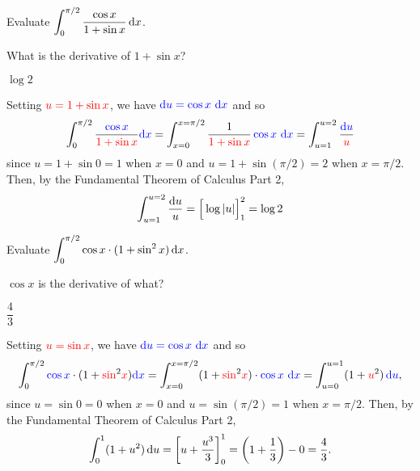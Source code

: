 \begin{question}[2012A]
Evaluate $\displaystyle \int_{0}^{\pi/2} \frac{\cos x} {1+\sin x}\,\mathrm{d}x$.
\end{question}

\begin{hint}
What is the derivative of $1+\sin x$?
\end{hint}

\begin{answer}
$\log 2 $
\end{answer}

\begin{solution}
Setting $\textcolor{red}{u=1+\sin x}$, we have $\textcolor{blue}{\mathrm{d}u = \cos x~\mathrm{d}x}$ and so
\begin{equation*}
 \int_{0}^{\pi/2} \frac{\textcolor{blue}{\cos x}} {\textcolor{red}{1+\sin x}} \textcolor{blue}{\mathrm{d}x }
  = \int_{x=0}^{x=\pi/2} \frac{1}{\textcolor{red}{1+\sin x}}\, \textcolor{blue}{\cos x ~\mathrm{d}x }
   = \int_{u=1}^{u=2} \frac{\textcolor{blue}{\mathrm{d}u}}{\textcolor{red}u}
\end{equation*}
since $u=1+\sin 0=1$ when $x=0$ and $u=1+\sin(\pi/2)=2$ when $x=\pi/2$.
Then, by the Fundamental Theorem of Calculus Part 2,
\begin{equation*}
\int_{u=1}^{u=2} \frac{\mathrm{d}u}{u}
  = \Big[\log|u| \Big]_{1}^{2} = \log 2
\end{equation*}
\end{solution}



\begin{question}[2016Q2]
Evaluate $\displaystyle \int_{0}^{\pi/2} \cos x \cdot (1+\sin^2 x)\,\mathrm{d}x$.
\end{question}

\begin{hint}
$\cos x$ is the derivative of what?
\end{hint}

\begin{answer}
$\dfrac{4}{3}$
\end{answer}

\begin{solution}
Setting $\textcolor{red}{u=\sin x}$, we have $\textcolor{blue}{\mathrm{d}u = \cos x~\mathrm{d}x}$ and so
\begin{equation*}
 \int_{0}^{\pi/2} \textcolor{blue}{\cos x} \cdot (1+\textcolor{red}{\sin}^2 \textcolor{red}x)\textcolor{blue}{\mathrm{d}x }
  = \int_{x=0}^{x=\pi/2} (1+\textcolor{red}{\sin}^2 \textcolor{red}{x})\cdot \textcolor{blue}{\cos x ~\mathrm{d}x }
   = \int_{u=0}^{u=1} (1+\textcolor{red}{u}^2) \,\textcolor{blue}{\mathrm{d}u},
\end{equation*}
since $u=\sin 0=0$ when $x=0$ and $u=\sin(\pi/2)=1$ when $x=\pi/2$. Then, by the Fundamental Theorem of Calculus Part 2,
\begin{equation*}
\int_{0}^{1} (1+u^2) \,\mathrm{d}u
  = \left[u+\frac{u^3}{3} \right]_{0}^{1} =\left(1+\frac{1}{3}\right) -0 = \frac{4}{3}.
\end{equation*}
\end{solution}


